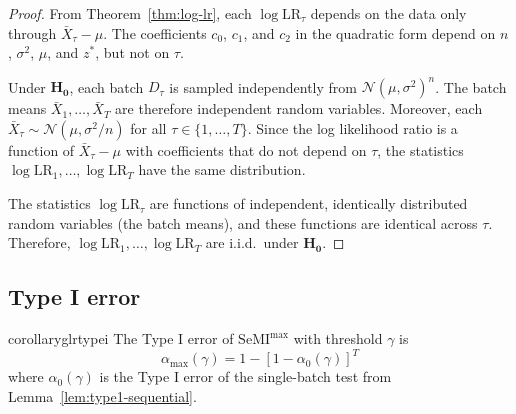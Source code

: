 \documentclass{article}
\theoremstyle{plain}
\theoremstyle{definition}
\theoremstyle{remark}
\newcommand{\SeMImax}{\mathrm{SeMI}^{\max}}
\begin{document}
\begin{proof}
    From Theorem~\ref{thm:log-lr}, each $\log \mathrm{LR}_\tau$ depends on the data only through $\bar{X}_\tau - \mu$. The coefficients $c_0$, $c_1$, and $c_2$ in the quadratic form depend on $n$, $\sigma^2$, $\mu$, and $z^*$, but not on $\tau$.

    Under $\mathbf{H_0}$, each batch $D_\tau$ is sampled independently from $\mathcal{N}(\mu, \sigma^2)^n$. The batch means $\bar{X}_1, \ldots, \bar{X}_T$ are therefore independent random variables. Moreover, each $\bar{X}_\tau \sim \mathcal{N}(\mu, \sigma^2/n)$ for all $\tau \in \{1, \ldots, T\}$. Since the log likelihood ratio is a function of $\bar{X}_\tau - \mu$ with coefficients that do not depend on $\tau$, the statistics $\log \mathrm{LR}_1, \ldots, \log \mathrm{LR}_T$ have the same distribution.

    The statistics $\log \mathrm{LR}_\tau$ are functions of independent, identically distributed random variables (the batch means), and these functions are identical across $\tau$. Therefore, $\log \mathrm{LR}_1, \ldots, \log \mathrm{LR}_T$ are i.i.d.\ under $\mathbf{H_0}$.
\end{proof}

\subsection{Type I error}
\label{app:proof-glr-type1}

\begin{restatable}[$\SeMImax$ Type I Error]{corollary}{glrtypei}
	\label{cor:glr-type1}
	The Type I error of $\SeMImax$ with threshold $\gamma$ is
	\begin{equation*}
		\alpha_{\max}(\gamma) = 1 - [1 - \alpha_0(\gamma)]^T
	\end{equation*}
	where $\alpha_0(\gamma)$ is the Type I error of the single-batch test from Lemma~\ref{lem:type1-sequential}.
\end{restatable}
\end{document}
